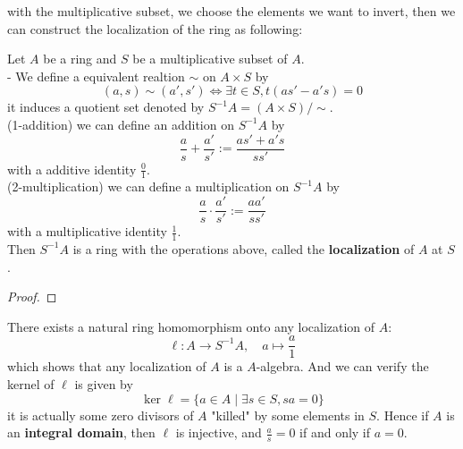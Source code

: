 with the multiplicative subset, we choose the elements we want to invert, then we can construct the localization of the ring as following:
\begin{lemma}
    Let \(A\) be a ring and \(S\) be a multiplicative subset of \(A\).\\

    - We define a equivalent realtion \(\sim\) on \(A \times S\) by
    \[(a,s)\sim (a',s') \iff \exists t \in S, t(as'-a's) = 0\]
    it induces a quotient set denoted by \(S^{-1}A = (A \times S)/\sim\).\\

    (1-addition) we can define an addition on \(S^{-1}A\) by
    \[\frac{a}{s} + \frac{a'}{s'} := \frac{as' + a's}{ss'}\]
    with a additive identity \(\frac{0}{1}\).\\

    (2-multiplication) we can define a multiplication on \(S^{-1}A\) by
    \[\frac{a}{s} \cdot \frac{a'}{s'} := \frac{aa'}{ss'}\]
    with a multiplicative identity \(\frac{1}{1}\).\\

    Then \(S^{-1}A\) is a ring with the operations above, called the \textbf{localization} of \(A\) at \(S\).\\

\end{lemma}
\begin{proof}
    
\end{proof}

\begin{remark}
    There exists a natural ring homomorphism onto any localization of \(A\):
    \[\ell: A \to S^{-1}A, \quad a \mapsto \frac{a}{1}\]
    which shows that any localization of \(A\) is a \(A\)-algebra. And we can verify the kernel of \(\ell\) is given by
    \[\ker \ell = \{a \in A \mid \exists s \in S, sa = 0\}\]
    it is actually some zero divisors of \(A\) "killed" by some elements in \(S\). Hence if \(A\) is an \textbf{integral domain}, then \(\ell\) is injective, and \(\frac{a}{s} = 0\) if and only if \(a = 0\).
\end{remark}

